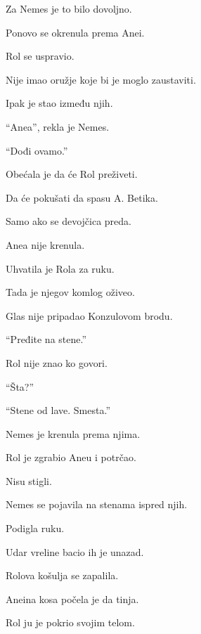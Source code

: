 Za Nemes je to bilo dovoljno.

\bigskip

Ponovo se okrenula prema Anei.

\bigskip

Rol se uspravio.

Nije imao oružje koje bi je moglo zaustaviti.

Ipak je stao između njih.

\bigskip

``Anea'', rekla je Nemes.

``Dođi ovamo.''

\bigskip

Obećala je da će Rol preživeti.

Da će pokušati da spasu A. Betika.

\bigskip

Samo ako se devojčica preda.

\bigskip

Anea nije krenula.

Uhvatila je Rola za ruku.

\bigskip

Tada je njegov komlog oživeo.

\bigskip

Glas nije pripadao Konzulovom brodu.

``Pređite na stene.''

\bigskip

Rol nije znao ko govori.

``Šta?''

``Stene od lave. Smesta.''

\bigskip

Nemes je krenula prema njima.

\bigskip

Rol je zgrabio Aneu i potrčao.

\bigskip

Nisu stigli.

\bigskip

Nemes se pojavila na stenama ispred njih.

Podigla ruku.

\bigskip

Udar vreline bacio ih je unazad.

Rolova košulja se zapalila.

Aneina kosa počela je da tinja.

\bigskip

Rol ju je pokrio svojim telom.

\bigskip

